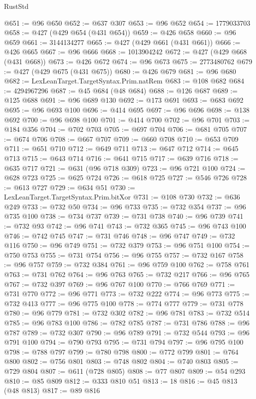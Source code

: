 \begin{lexlean}{RustStd}
\begin{coremodule}
@651 := @96 @650
@652 := @637 @307
@653 := @96 @652
@654 := 1779033703
@658 := @427 (@429 @654 (@431 @654))
@659 := @426 @658
@660 := @96 @659
@661 := 3144134277
@665 := @427 (@429 @661 (@431 @661))
@666 := @426 @665
@667 := @96 @666
@668 := 1013904242
@672 := @427 (@429 @668 (@431 @668))
@673 := @426 @672
@674 := @96 @673
@675 := 2773480762
@679 := @427 (@429 @675 (@431 @675))
@680 := @426 @679
@681 := @96 @680
@682 := LexLeanTarget.TargetSyntax.Prim.natRem
@683 := @108 @682
@684 := 4294967296
@687 := @45 @684 (@48 @684)
@688 := @126 @687
@689 := @125 @688
@691 := @96 @689 @130
@692 := @173 @691
@693 := @683 @692
@695 := @96 @693 @100
@696 := @414 @695
@697 := @96 @696
@698 := @138 @692
@700 := @96 @698 @100
@701 := @414 @700
@702 := @96 @701
@703 := @184 @356
@704 := @702 @703
@705 := @697 @704
@706 := @681 @705
@707 := @674 @706
@708 := @667 @707
@709 := @660 @708
@710 := @653 @709
@711 := @651 @710
@712 := @649 @711
@713 := @647 @712
@714 := @645 @713
@715 := @643 @714
@716 := @641 @715
@717 := @639 @716
@718 := @635 @717
@721 := @631 (@96 @718 @309)
@723 := @96 @721 @100
@724 := @628 @723
@725 := @625 @724
@726 := @618 @725
@727 := @546 @726
@728 := @613 @727
@729 := @634 @51
@730 := LexLeanTarget.TargetSyntax.Prim.bitXor
@731 := @108 @730
@732 := @636 @249
@733 := @732 @50
@734 := @96 @733
@735 := @732 @354
@737 := @96 @735 @100
@738 := @734 @737
@739 := @731 @738
@740 := @96 @739
@741 := @732 @93
@742 := @96 @741
@743 := @732 @365
@745 := @96 @743 @100
@746 := @742 @745
@747 := @731 @746
@748 := @96 @747
@749 := @732 @116
@750 := @96 @749
@751 := @732 @379
@753 := @96 @751 @100
@754 := @750 @753
@755 := @731 @754
@756 := @96 @755
@757 := @732 @167
@758 := @96 @757
@759 := @732 @384
@761 := @96 @759 @100
@762 := @758 @761
@763 := @731 @762
@764 := @96 @763
@765 := @732 @217
@766 := @96 @765
@767 := @732 @397
@769 := @96 @767 @100
@770 := @766 @769
@771 := @731 @770
@772 := @96 @771
@773 := @732 @222
@774 := @96 @773
@775 := @732 @413
@777 := @96 @775 @100
@778 := @774 @777
@779 := @731 @778
@780 := @96 @779
@781 := @732 @302
@782 := @96 @781
@783 := @732 @514
@785 := @96 @783 @100
@786 := @782 @785
@787 := @731 @786
@788 := @96 @787
@789 := @732 @307
@790 := @96 @789
@791 := @732 @544
@793 := @96 @791 @100
@794 := @790 @793
@795 := @731 @794
@797 := @96 @795 @100
@798 := @788 @797
@799 := @780 @798
@800 := @772 @799
@801 := @764 @800
@802 := @756 @801
@803 := @748 @802
@804 := @740 @803
@805 := @729 @804
@807 := @611 (@728 @805)
@808 := @77 @807
@809 := @54 @293
@810 := @85 @809
@812 := @333 @810 @51
@813 := 18
@816 := @45 @813 (@48 @813)
@817 := @89 @816

\end{coremodule}
\end{lexlean}
